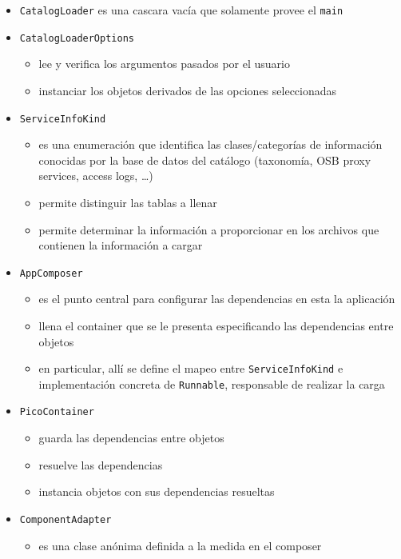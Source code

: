 \begin{itemize}
    \item \verb|CatalogLoader| es una cascara vac\'ia que solamente provee el \verb|main|
    \item \verb|CatalogLoaderOptions|
      \begin{itemize}
      \item lee y verifica los argumentos pasados por el usuario 
      \item instanciar los objetos derivados de las opciones seleccionadas
      \end{itemize}
    \item \verb|ServiceInfoKind|
      \begin{itemize}
      \item es una enumeraci\'on que identifica las clases/categor\'ias
            de informaci\'on conocidas por la base de datos del cat\'alogo
              (taxonom\'ia, OSB proxy services, access logs, \ldots)
      \item permite distinguir las tablas a llenar
      \item permite determinar la informaci\'on a proporcionar en los archivos 
            que contienen la informaci\'on a cargar
      \end{itemize}
    \item \verb|AppComposer| 
      \begin{itemize}
      \item es el punto central para configurar las dependencias en esta la aplicaci\'on
      \item llena el container que se le presenta especificando las dependencias entre objetos
      \item en particular, all\'i se define el mapeo entre \verb|ServiceInfoKind|
            e implementaci\'on concreta de \verb|Runnable|, responsable de realizar la carga
      \end{itemize}
    \item \verb|PicoContainer| 
      \begin{itemize}
      \item guarda las dependencias entre objetos
      \item resuelve las dependencias
      \item instancia objetos con sus dependencias resueltas
      \end{itemize}
    \item \verb|ComponentAdapter| 
      \begin{itemize}
      \item es una clase an\'onima definida a la medida en el composer 

\end{itemize}
\end{itemize}
